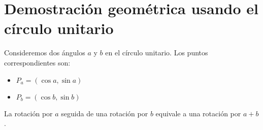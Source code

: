 \section{Demostración geométrica usando el círculo unitario}\label{sec:geom}
Consideremos dos ángulos $a$ y $b$ en el círculo unitario. Los puntos correspondientes son:
\begin{itemize}
  \item $P_a = (\cos a, \sin a)$
  \item $P_b = (\cos b, \sin b)$
\end{itemize}
La rotación por $a$ seguida de una rotación por $b$ equivale a una rotación por $a + b$.
